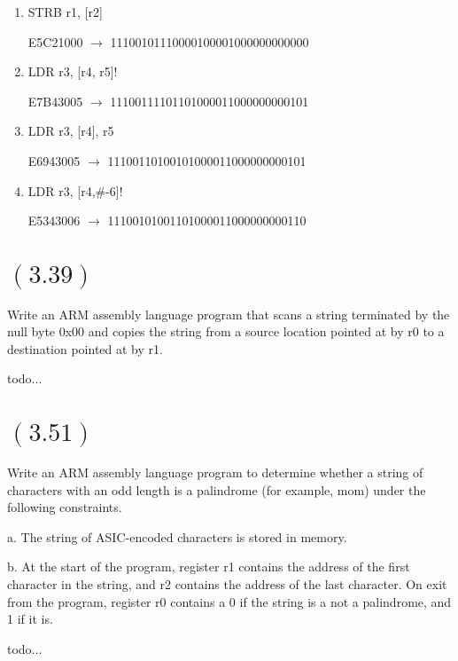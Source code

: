 \documentclass[letterpaper,12pt,titlepage]{article}
\begin{document}
\renewcommand{\labelenumi}{\alph{enumi})}
\begin{enumerate}

\item STRB r1, [r2]

\begin{mdframed}[style=MyFrame]
E5C21000 $\rightarrow$ 11100101110000100001000000000000
\end{mdframed}

\item LDR r3, [r4, r5]!

\begin{mdframed}[style=MyFrame]
E7B43005 $\rightarrow$ 11100111101101000011000000000101
\end{mdframed}

\item LDR r3, [r4], r5

\begin{mdframed}[style=MyFrame]
E6943005 $\rightarrow$ 11100110100101000011000000000101
\end{mdframed}

\item LDR r3, [r4,\#-6]! 

\begin{mdframed}[style=MyFrame]
E5343006 $\rightarrow$ 11100101001101000011000000000110
\end{mdframed}

\end{enumerate}

\section*{$(3.39)$} Write an ARM assembly language program that scans a string terminated by the null byte 0x00 and copies the string from a source location pointed at by r0 to a destination pointed at by r1. 

\begin{mdframed}[style=MyFrame]
todo...
\end{mdframed}

\section*{$(3.51)$} Write an ARM assembly language program to determine whether a string of characters with an odd length is a palindrome (for example, mom) under the following constraints.

a. The string of ASIC-encoded characters is stored in memory.

b. At the start of the program, register r1 contains the address of the first character in the string, and r2 contains the address of the last character. On exit from the program, register r0 contains a 0 if the string is a not a palindrome, and 1 if it is. \newline

\begin{mdframed}[style=MyFrame]
todo...
\end{mdframed}



\end{document}
